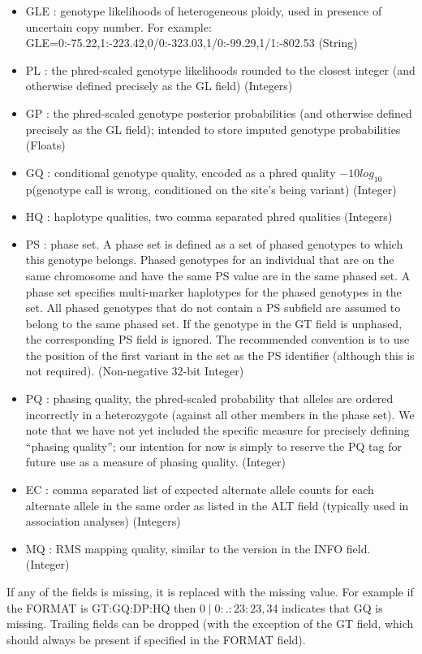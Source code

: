 \documentclass[8pt]{article}
\begin{document}
\begin{itemize}
  \item GLE : genotype likelihoods of heterogeneous ploidy, used in presence of uncertain copy number. For example: GLE=0:-75.22,1:-223.42,0/0:-323.03,1/0:-99.29,1/1:-802.53 (String)
  \item PL : the phred-scaled genotype likelihoods rounded to the closest integer (and otherwise defined precisely as the GL field) (Integers)
  \item GP : the phred-scaled genotype posterior probabilities (and otherwise defined precisely as the GL field); intended to store imputed genotype probabilities (Floats)
  \item GQ : conditional genotype quality, encoded as a phred quality $-10log_{10}$ p(genotype call is wrong, conditioned on the site's being variant) (Integer)
  \item HQ : haplotype qualities, two comma separated phred qualities (Integers)
  \item PS : phase set.  A phase set is defined as a set of phased genotypes to which this genotype belongs.  Phased genotypes for an individual that are on the same chromosome and have the same PS value are in the same phased set.  A phase set specifies multi-marker haplotypes for the phased genotypes in the set.  All phased genotypes that do not contain a PS subfield are assumed to belong to the same phased set.  If the genotype in the GT field is unphased, the corresponding PS field is ignored.  The recommended convention is to use the position of the first variant in the set as the PS identifier (although this is not required). (Non-negative 32-bit Integer)
  \item PQ : phasing quality, the phred-scaled probability that alleles are ordered incorrectly in a heterozygote (against all other members in the phase set).  We note that we have not yet included the specific measure for precisely defining ``phasing quality''; our intention for now is simply to reserve the PQ tag for future use as a measure of phasing quality. (Integer)
  \item EC : comma separated list of expected alternate allele counts for each alternate allele in the same order as listed in the ALT field (typically used in association analyses) (Integers)
  \item MQ : RMS mapping quality, similar to the version in the INFO field. (Integer)
\end{itemize}

If any of the fields is missing, it is replaced with the missing value. For example if the FORMAT is GT:GQ:DP:HQ then $0\mid0:.:23:23,34$ indicates that GQ is missing. Trailing fields can be dropped (with the exception of the GT field, which should always be present if specified in the FORMAT field).
\end{document}

